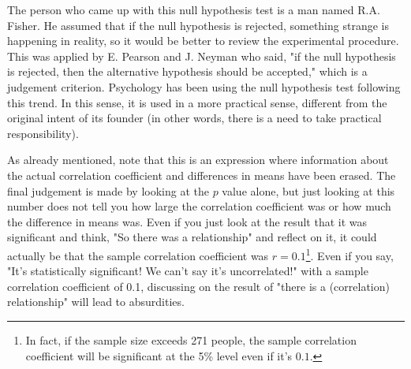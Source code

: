 \documentclass{ltjsbook}
\begin{document}
The person who came up with this null hypothesis test is a man named R.A. Fisher. He assumed that if the null hypothesis is rejected, something strange is happening in reality, so it would be better to review the experimental procedure. This was applied by E. Pearson and J. Neyman who said, "if the null hypothesis is rejected, then the alternative hypothesis should be accepted," which is a judgement criterion. Psychology has been using the null hypothesis test following this trend. In this sense, it is used in a more practical sense, different from the original intent of its founder (in other words, there is a need to take practical responsibility).

As already mentioned, note that this is an expression where information about the actual correlation coefficient and differences in means have been erased. The final judgement is made by looking at the $p$ value alone, but just looking at this number does not tell you how large the correlation coefficient was or how much the difference in means was. Even if you just look at the result that it was significant and think, "So there was a relationship" and reflect on it, it could actually be that the sample correlation coefficient was $r=0.1$\footnote{In fact, if the sample size exceeds 271 people, the sample correlation coefficient will be significant at the 5\% level even if it's $0.1$.}. Even if you say, "It's statistically significant! We can't say it's uncorrelated!" with a sample correlation coefficient of 0.1, discussing on the result of "there is a (correlation) relationship" will lead to absurdities.
\end{document}
